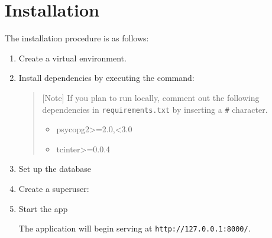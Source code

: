\section{Installation}
The installation procedure is as follows:

\begin{enumerate}
\def\labelenumi{\arabic{enumi}.}
\item
  Create a virtual environment.

\item
  Install dependencies by executing the command:


\begin{Shaded}
\begin{Highlighting}[]
\end{Highlighting}
\end{Shaded}

  \begin{quote}
  {[}Note{]} If you plan to run locally, comment out the following
  dependencies in \texttt{requirements.txt} by inserting a \texttt{\#}
  character.

  \begin{itemize}
  \tightlist
  \item
    psycopg2\textgreater=2.0,\textless3.0
  \item
    tcinter\textgreater=0.0.4
  \end{itemize}
  \end{quote}


\item
  Set up the database

\begin{Shaded}
\begin{Highlighting}[]
 
\end{Highlighting}
\end{Shaded}
\item 
  Create a superuser:

\begin{Shaded}
\begin{Highlighting}[]
\OperatorTok{=}
\end{Highlighting}
\end{Shaded}
\item
  Start the app

\begin{Shaded}
\begin{Highlighting}[]
\OperatorTok{=}
\end{Highlighting}
\end{Shaded}

The application will begin serving at \texttt{http://127.0.0.1:8000/}.
\end{enumerate}


